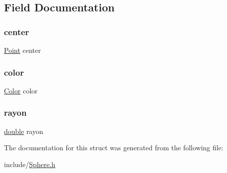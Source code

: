 \subsection{Field Documentation}
\mbox{\label{struct_sphere_a24bb1c337bce91dd3e7a4a4372b11793}} 
\subsubsection{\texorpdfstring{center}{center}}
{\footnotesize\ttfamily \hyperlink{struct_point}{Point} center}

\mbox{\label{struct_sphere_aa5f4d1eda21c196bd8401ff73f105073}} 
\subsubsection{\texorpdfstring{color}{color}}
{\footnotesize\ttfamily \hyperlink{struct_color}{Color} color}

\mbox{\label{struct_sphere_a2459aedac9f8646ad9566164a9a83f41}} 
\subsubsection{\texorpdfstring{rayon}{rayon}}
{\footnotesize\ttfamily \hyperlink{g3x__transfo_8h_a89b2b23e407882a535d835574a7912e1}{double} rayon}



The documentation for this struct was generated from the following file\+:\begin{DoxyCompactItemize}
\item 
include/\hyperlink{_sphere_8h}{Sphere.\+h}\end{DoxyCompactItemize}
